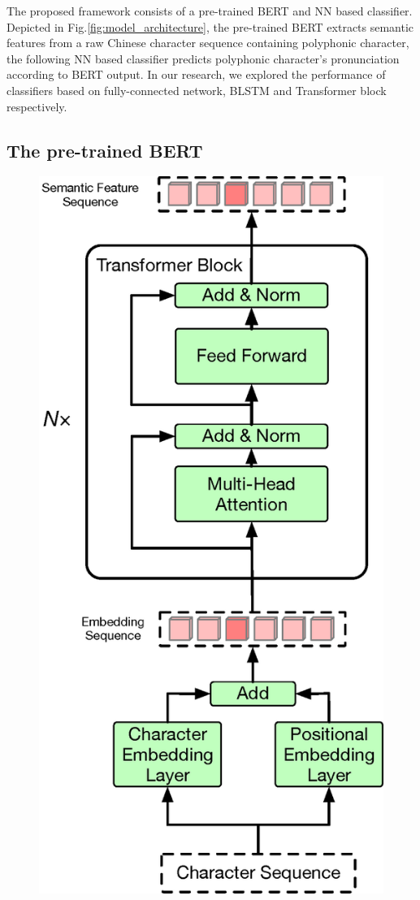 \documentclass[a4paper]{article}
\begin{document}
The proposed framework consists of a pre-trained BERT and NN based classifier. Depicted in  Fig.\ref{fig:model_architecture}, the pre-trained BERT extracts semantic features from a raw Chinese character sequence containing polyphonic character, the following NN based classifier predicts polyphonic character's pronunciation according to BERT output. In our research, we explored the performance of classifiers based on fully-connected network, BLSTM and Transformer block respectively.


\subsection{The pre-trained BERT}

\begin{figure}[t]
	\centering
	\includegraphics[scale=0.33]{pics3/bert2.eps}

\end{figure}
\end{document}
